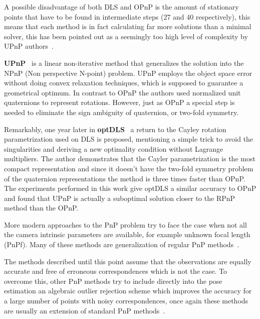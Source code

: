 \documentclass[letterpaper, 10 pt, conference]{ieeeconf}  %
\begin{document}
	A possible disadvantage of both DLS and OPnP is the amount of stationary points that have to be found in intermediate steps (27 and 40 respectively), this means that each method is in fact calculating far more solutions than a minimal solver, this has been pointed out as a seemingly too high level of complexity by UPnP authors~\cite{Kneip2014}.
	
	\textbf{UPnP}~\cite{Kneip2014} is a linear non-iterative method that generalizes the solution into the NPnP (Non perspective N-point) problem. UPnP employs the object space error without doing convex relaxation techniques, which is supposed to guarantee a geometrical optimum. In contrast to OPnP the authors used normalized unit quaternions to represent rotations. However, just as OPnP a special step is needed to eliminate the sign ambiguity of quaternion, or two-fold symmetry. %
	
	Remarkably, one year later in \textbf{optDLS}~\cite{Nakano2015} a return to the Cayley rotation parametrization used on DLS is proposed, mentioning a simple trick to avoid the singularities and deriving a new optimality condition without Lagrange multipliers. The author demonstrates that the Cayler parametrization is the most compact representation and since it doesn't have the two-fold symmetry problem of the quaternion representations the method is three times faster than OPnP. The experiments performed in this work give optDLS a similar accuracy to OPnP and found that UPnP is actually a suboptimal solution closer to the RPnP method than the OPnP. %
	
	More modern approaches to the PnP problem try to face the case when not all the camera intrinsic parameters are available, for example unknown focal length (PnPf). Many of these methods are generalization of regular PnP methods~\cite{Zheng2014,Kanaeva2015,Changchang2015,Zheng2016}. 
	
	The methods described until this point assume that the observations are equally accurate and free of erroneous correspondences which is not the case. To overcome this, other PnP methods try to include directly into the pose estimation an algebraic outlier rejection scheme which improves the accuracy for a large number of points with noisy correspondences, once again these methods are usually an extension of standard PnP methods~\cite{Ferraz2014b,Ferraz2014,Urban2016}.
	
\end{document}
